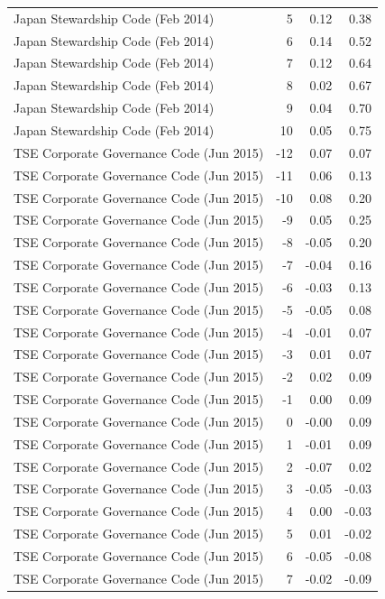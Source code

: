 \begin{table}
\begin{tabular}{lrrr}
Japan Stewardship Code (Feb 2014) & 5 & 0.12 & 0.38 \\
Japan Stewardship Code (Feb 2014) & 6 & 0.14 & 0.52 \\
Japan Stewardship Code (Feb 2014) & 7 & 0.12 & 0.64 \\
Japan Stewardship Code (Feb 2014) & 8 & 0.02 & 0.67 \\
Japan Stewardship Code (Feb 2014) & 9 & 0.04 & 0.70 \\
Japan Stewardship Code (Feb 2014) & 10 & 0.05 & 0.75 \\
TSE Corporate Governance Code (Jun 2015) & -12 & 0.07 & 0.07 \\
TSE Corporate Governance Code (Jun 2015) & -11 & 0.06 & 0.13 \\
TSE Corporate Governance Code (Jun 2015) & -10 & 0.08 & 0.20 \\
TSE Corporate Governance Code (Jun 2015) & -9 & 0.05 & 0.25 \\
TSE Corporate Governance Code (Jun 2015) & -8 & -0.05 & 0.20 \\
TSE Corporate Governance Code (Jun 2015) & -7 & -0.04 & 0.16 \\
TSE Corporate Governance Code (Jun 2015) & -6 & -0.03 & 0.13 \\
TSE Corporate Governance Code (Jun 2015) & -5 & -0.05 & 0.08 \\
TSE Corporate Governance Code (Jun 2015) & -4 & -0.01 & 0.07 \\
TSE Corporate Governance Code (Jun 2015) & -3 & 0.01 & 0.07 \\
TSE Corporate Governance Code (Jun 2015) & -2 & 0.02 & 0.09 \\
TSE Corporate Governance Code (Jun 2015) & -1 & 0.00 & 0.09 \\
TSE Corporate Governance Code (Jun 2015) & 0 & -0.00 & 0.09 \\
TSE Corporate Governance Code (Jun 2015) & 1 & -0.01 & 0.09 \\
TSE Corporate Governance Code (Jun 2015) & 2 & -0.07 & 0.02 \\
TSE Corporate Governance Code (Jun 2015) & 3 & -0.05 & -0.03 \\
TSE Corporate Governance Code (Jun 2015) & 4 & 0.00 & -0.03 \\
TSE Corporate Governance Code (Jun 2015) & 5 & 0.01 & -0.02 \\
TSE Corporate Governance Code (Jun 2015) & 6 & -0.05 & -0.08 \\
TSE Corporate Governance Code (Jun 2015) & 7 & -0.02 & -0.09 \\

\end{tabular}
\end{table}
